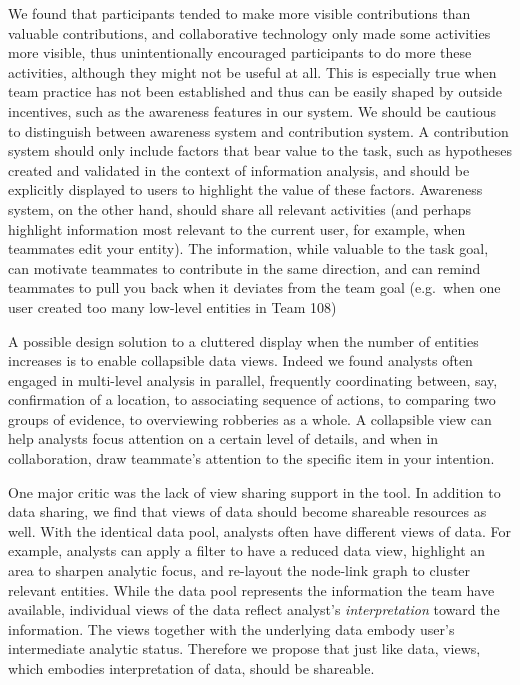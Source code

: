 \documentclass[]{article}
\begin{document}
We found that participants tended to make more visible contributions
than valuable contributions, and collaborative technology only made some
activities more visible, thus unintentionally encouraged participants to
do more these activities, although they might not be useful at all. This
is especially true when team practice has not been established and thus
can be easily shaped by outside incentives, such as the awareness
features in our system. We should be cautious to distinguish between
awareness system and contribution system. A contribution system should
only include factors that bear value to the task, such as hypotheses
created and validated in the context of information analysis, and should
be explicitly displayed to users to highlight the value of these
factors. Awareness system, on the other hand, should share all relevant
activities (and perhaps highlight information most relevant to the
current user, for example, when teammates edit your entity). The
information, while valuable to the task goal, can motivate teammates to
contribute in the same direction, and can remind teammates to pull you
back when it deviates from the team goal (e.g.~when one user created too
many low-level entities in Team 108)

A possible design solution to a cluttered display when the number of
entities increases is to enable collapsible data views. Indeed we found
analysts often engaged in multi-level analysis in parallel, frequently
coordinating between, say, confirmation of a location, to associating
sequence of actions, to comparing two groups of evidence, to overviewing
robberies as a whole. A collapsible view can help analysts focus
attention on a certain level of details, and when in collaboration, draw
teammate's attention to the specific item in your intention.

One major critic was the lack of view sharing support in the tool. In
addition to data sharing, we find that views of data should become
shareable resources as well. With the identical data pool, analysts
often have different views of data. For example, analysts can apply a
filter to have a reduced data view, highlight an area to sharpen
analytic focus, and re-layout the node-link graph to cluster relevant
entities. While the data pool represents the information the team have
available, individual views of the data reflect analyst's
\emph{interpretation} toward the information. The views together with
the underlying data embody user's intermediate analytic status.
Therefore we propose that just like data, views, which embodies
interpretation of data, should be shareable.
\end{document}
